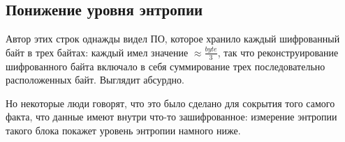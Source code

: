 \subsection{Понижение уровня энтропии}

Автор этих строк однажды видел ПО, которое хранило каждый шифрованный байт в трех байтах:
каждый имел значение {\Large $\approx \frac{byte}{3}$}, так что реконструирование шифрованного байта включало в себя
суммирование трех последовательно расположенных байт.
Выглядит абсурдно.

Но некоторые люди говорят, что это было сделано для сокрытия того самого факта, что данные имеют внутри что-то зашифрованное:
измерение энтропии такого блока покажет уровень энтропии намного ниже.

